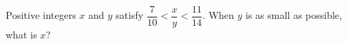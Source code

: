 Positive integers $x$ and $y$ satisfy $\dfrac7{10}<\dfrac xy<\dfrac{11}{14}$. When $y$ is as small as possible, what is $x$?

